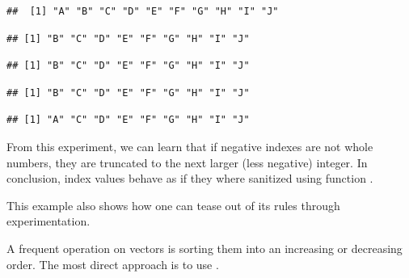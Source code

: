 \documentclass[krantz2]{krantz}\usepackage{knitr}
\begin{document}
\begin{explainbox}
\begin{knitrout}\footnotesize
{}\color{fgcolor}\begin{kframe}
\begin{alltt}
 \hlkwb{<-} \hlstd{LETTERS[}\hlopt{:}\hlstd{]}
\end{alltt}
\begin{verbatim}
##  [1] "A" "B" "C" "D" "E" "F" "G" "H" "I" "J"
\end{verbatim}
\begin{alltt}
\hlstd{b[}\hlopt{-}\hlstd{]}
\end{alltt}
\begin{verbatim}
## [1] "B" "C" "D" "E" "F" "G" "H" "I" "J"
\end{verbatim}
\begin{alltt}
\hlstd{b[}\hlopt{-}\hlstd{]}
\end{alltt}
\begin{verbatim}
## [1] "B" "C" "D" "E" "F" "G" "H" "I" "J"
\end{verbatim}
\begin{alltt}
\hlstd{b[}\hlopt{-}\hlstd{]}
\end{alltt}
\begin{verbatim}
## [1] "B" "C" "D" "E" "F" "G" "H" "I" "J"
\end{verbatim}
\begin{alltt}
\hlstd{b[}\hlopt{-}\hlstd{]}
\end{alltt}
\begin{verbatim}
## [1] "A" "C" "D" "E" "F" "G" "H" "I" "J"
\end{verbatim}
\end{kframe}
\end{knitrout}

From this experiment, we can learn that if negative indexes are not whole numbers, they are truncated to the next larger (less negative) integer. In conclusion,  index values behave as if they where sanitized using function .

This example also shows how one can tease out of \Rlang its rules through experimentation.

\end{explainbox}

A frequent operation on vectors is sorting them into an increasing or decreasing order. The most direct approach is to use .
\end{document}
